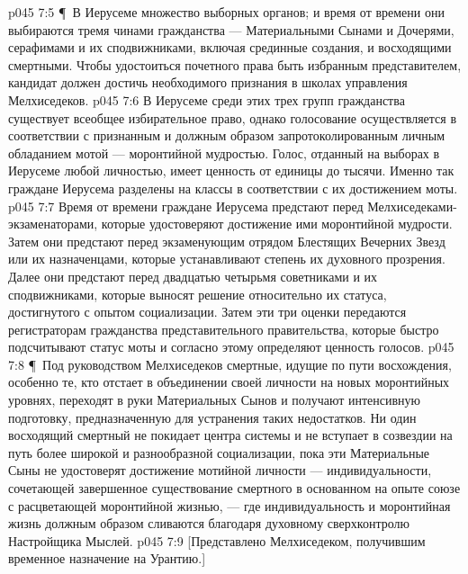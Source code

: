 \vs p045 7:5 \P\ В Иерусеме множество выборных органов; и время от времени они выбираются тремя чинами гражданства --- Материальными Сынами и Дочерями, серафимами и их сподвижниками, включая срединные создания, и восходящими смертными. Чтобы удостоиться почетного права быть избранным представителем, кандидат должен достичь необходимого признания в школах управления Мелхиседеков.
\vs p045 7:6 В Иерусеме среди этих трех групп гражданства существует всеобщее избирательное право, однако голосование осуществляется в соответствии с признанным и должным образом запротоколированным личным обладанием мотой --- моронтийной мудростью. Голос, отданный на выборах в Иерусеме любой личностью, имеет ценность от единицы до тысячи. Именно так граждане Иерусема разделены на классы в соответствии с их достижением моты.
\vs p045 7:7 Время от времени граждане Иерусема предстают перед Мелхиседеками\hyp{}экзаменаторами, которые удостоверяют достижение ими моронтийной мудрости. Затем они предстают перед экзаменующим отрядом Блестящих Вечерних Звезд или их назначенцами, которые устанавливают степень их духовного прозрения. Далее они предстают перед двадцатью четырьмя советниками и их сподвижниками, которые выносят решение относительно их статуса, достигнутого с опытом социализации. Затем эти три оценки передаются регистраторам гражданства представительного правительства, которые быстро подсчитывают статус моты и согласно этому определяют ценность голосов.
\vs p045 7:8 \P\ Под руководством Мелхиседеков смертные, идущие по пути восхождения, особенно те, кто отстает в объединении своей личности на новых моронтийных уровнях, переходят в руки Материальных Сынов и получают интенсивную подготовку, предназначенную для устранения таких недостатков. Ни один восходящий смертный не покидает центра системы и не вступает в созвездии на путь более широкой и разнообразной социализации, пока эти Материальные Сыны не удостоверят достижение мотийной личности --- индивидуальности, сочетающей завершенное существование смертного в основанном на опыте союзе с расцветающей моронтийной жизнью, --- где индивидуальность и моронтийная жизнь должным образом сливаются благодаря духовному сверхконтролю Настройщика Мыслей.
\vs p045 7:9 [Представлено Мелхиседеком, получившим временное назначение на Урантию.]
